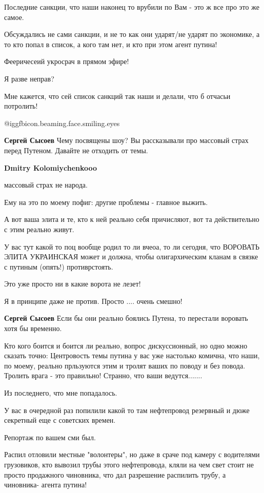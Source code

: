 \begin{itemize}
\begin{itemize}
Последние санкции, что наши наконец то врубили по Вам - это ж все про это же
самое.

Обсуждались не сами санкции, и не то как они ударят/не ударят по экономике, а
то кто попал в список, а кого там нет, и кто при этом агент путина!

Фееричесеий укросрач в прямом эфире!

Я разве неправ?

Мне кажется, что сей список санкций так наши и делали, что б отчасьи потролить!

@igg{fbicon.beaming.face.smiling.eyes} 

\textbf{Сергей Сысоев} Чему посвящены шоу? Вы рассказывали про массовый страх перед Путеном. Давайте не отходить от темы.

\textbf{Dmitry Kolomiychenkooo} 

массовый страх не народа.

Ему на это по моему пофиг: другие проблемы - главное выжить.

А вот ваша элита и те, кто к ней реально себя причисляют, вот та действительно
с этим реально живут.

У вас тут какой то поц вообще родил то ли вчеоа, то ли сегодня, что ВОРОВАТЬ
ЭЛИТА УКРАИНСКАЯ может и должна, чтобы олигархическим кланам в связке с путиным
(опять!) противрстоять.

Это уже просто ни в какие ворота не лезет!

Я в принципе даже не против.
Просто .... очень смешно!

\textbf{Сергей Сысоев} Если бы они реально боялись Путена, то перестали воровать хотя бы временно.


Кто кого боится и боится ли реально, вопрос дискуссионный, но одно можно
сказать точно: Центровость темы путина у вас уже настолько комична, что наши,
по моему, реально прльзуются этим и тролят ваших по поводу и без повода.
Тролить врага - это правильно!  Странно, что ваши ведутся.......


Из последнего, что мне попадалось.

У вас в очередной раз попилили какой то там нефтепровод резервный и дюже
секретный еще с советских времен.

Репортаж по вашем сми был.

Распил отловили местные "волонтеры", но даже в сраче под камеру с водителями
грузовиков, кто вывозил трубы этого нефтепровода, кляли на чем свет стоит не
просто продажного чиновника, что дал разрешение распилить трубу, а чиновника-
агента путина!


\end{itemize}
\end{itemize}
